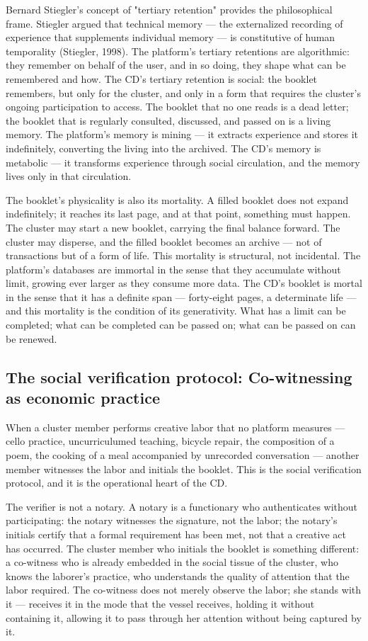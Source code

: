 Bernard Stiegler's concept of "tertiary retention" provides the philosophical frame. Stiegler argued that technical memory — the externalized recording of experience that supplements individual memory — is constitutive of human temporality (Stiegler, 1998). The platform's tertiary retentions are algorithmic: they remember on behalf of the user, and in so doing, they shape what can be remembered and how. The CD's tertiary retention is social: the booklet remembers, but only for the cluster, and only in a form that requires the cluster's ongoing participation to access. The booklet that no one reads is a dead letter; the booklet that is regularly consulted, discussed, and passed on is a living memory. The platform's memory is mining — it extracts experience and stores it indefinitely, converting the living into the archived. The CD's memory is metabolic — it transforms experience through social circulation, and the memory lives only in that circulation.

The booklet's physicality is also its mortality. A filled booklet does not expand indefinitely; it reaches its last page, and at that point, something must happen. The cluster may start a new booklet, carrying the final balance forward. The cluster may disperse, and the filled booklet becomes an archive — not of transactions but of a form of life. This mortality is structural, not incidental. The platform's databases are immortal in the sense that they accumulate without limit, growing ever larger as they consume more data. The CD's booklet is mortal in the sense that it has a definite span — forty-eight pages, a determinate life — and this mortality is the condition of its generativity. What has a limit can be completed; what can be completed can be passed on; what can be passed on can be renewed.

\subsection{The social verification protocol: Co-witnessing as economic practice}

When a cluster member performs creative labor that no platform measures — cello practice, uncurriculumed teaching, bicycle repair, the composition of a poem, the cooking of a meal accompanied by unrecorded conversation — another member witnesses the labor and initials the booklet. This is the social verification protocol, and it is the operational heart of the CD.

The verifier is not a notary. A notary is a functionary who authenticates without participating: the notary witnesses the signature, not the labor; the notary's initials certify that a formal requirement has been met, not that a creative act has occurred. The cluster member who initials the booklet is something different: a co-witness who is already embedded in the social tissue of the cluster, who knows the laborer's practice, who understands the quality of attention that the labor required. The co-witness does not merely observe the labor; she stands with it — receives it in the mode that the vessel receives, holding it without containing it, allowing it to pass through her attention without being captured by it.

